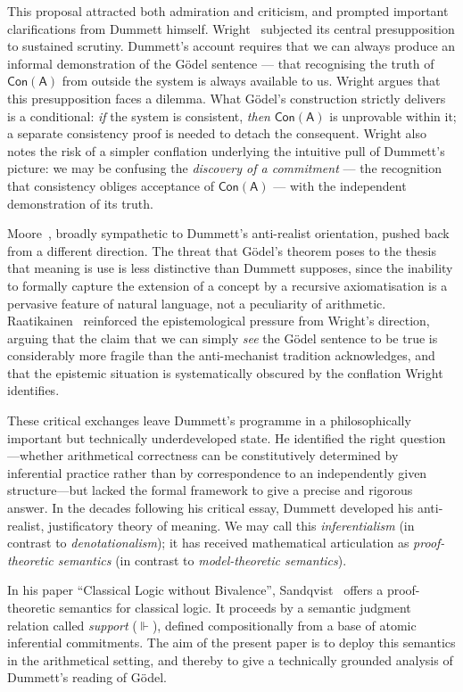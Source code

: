 \documentclass[reqno]{asl}
\newcommand{\supp}{\Vdash}
\newcommand{\pa}{\textsf{A}}
\newcommand{\Con}{\textsf{Con}}
\begin{document}
This proposal attracted both admiration and criticism, and prompted important clarifications from Dummett himself. Wright~\cite{wright1994} subjected its central presupposition to sustained scrutiny. Dummett's account requires that we can always produce an informal demonstration of the G\"{o}del sentence --- that recognising the truth of $\Con(\pa)$ from outside the system is always available to us. Wright argues that this presupposition faces a dilemma. What G\"{o}del's construction strictly delivers is a conditional: \textit{if} the system is consistent, \textit{then} $\Con(\pa)$ is unprovable within it; a separate consistency proof is needed to detach the consequent.  Wright also notes the risk of a simpler conflation underlying the intuitive pull of Dummett's picture: we may be confusing the \emph{discovery of a commitment} --- the recognition that consistency obliges acceptance of $\Con(\pa)$ --- with the independent demonstration of its truth.

Moore~\cite{moore1998}, broadly sympathetic to Dummett's anti-realist orientation, pushed back from a different direction. The threat that G\"{o}del's theorem poses to the thesis that meaning is use is less distinctive than Dummett supposes, since the inability to formally capture the extension of a concept by a recursive axiomatisation is a pervasive feature of natural language, not a peculiarity of arithmetic. Raatikainen~\cite{raatikainen2005} reinforced the epistemological pressure from Wright's direction, arguing that the claim that we can simply \emph{see} the G\"{o}del sentence to be true is considerably more fragile than the anti-mechanist tradition acknowledges, and that the epistemic situation is systematically obscured by the conflation Wright identifies.

These critical exchanges leave Dummett's programme in a philosophically important but technically underdeveloped state. He identified the right question---whether arithmetical correctness can be constitutively determined by inferential practice rather than by correspondence to an independently given structure---but lacked the formal framework to give a precise and rigorous answer. In the decades following his critical essay, Dummett developed his anti-realist, justificatory theory of meaning. We may call this \emph{inferentialism} (in contrast to \emph{denotationalism}); it has received mathematical articulation as \emph{proof-theoretic semantics} (in contrast to \emph{model-theoretic semantics}). 

In his paper ``Classical Logic without
Bivalence'', Sandqvist~\cite{Sandqvist2005inferentialist,Sandqvist_2009} offers a proof-theoretic semantics for classical logic. It proceeds by a
semantic judgment relation called \emph{support} ($\supp$), defined
compositionally from a base of atomic inferential commitments. The
aim of the present paper is to deploy this semantics in the arithmetical
setting, and thereby to give a technically grounded analysis of Dummett's
reading of G\"{o}del.
\end{document}
